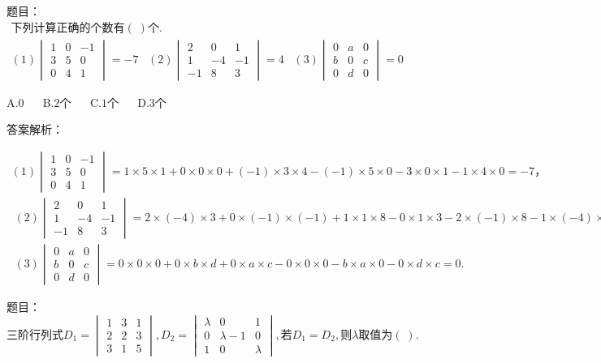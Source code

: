 题目：$\begin{array}{l}\mathrm{下列计算正确的个数有}(\;)个.\\(1)\begin{vmatrix}1&0&-1\\3&5&0\\0&4&1\end{vmatrix}=-7\;\;\;(2)\begin{vmatrix}2&0&1\\1&-4&-1\\-1&8&3\end{vmatrix}=4\;\;\;(3)\begin{vmatrix}0&a&0\\b&0&c\\0&d&0\end{vmatrix}=0\end{array}$

A.$0$ $\quad$ B.$2个$ $\quad$ C.$1个$ $\quad$ D.$3个$

答案解析：

$\begin{array}{l}(1)\begin{vmatrix}1&0&-1\\3&5&0\\0&4&1\end{vmatrix}=1\times5\times1+0\times0\times0+(-1)\times3\times4-(-1)\times5\times0-3\times0\times1-1\times4\times0=-7，\\\;(2)\begin{vmatrix}2&0&1\\1&-4&-1\\-1&8&3\end{vmatrix}=2\times(-4)\times3+0\times(-1)\times(-1)+1\times1\times8-0\times1\times3-2\times(-1)\times8-1\times(-4)\times(-1)=-24+8+16-4=-4，\\\;(3)\begin{vmatrix}0&a&0\\b&0&c\\0&d&0\end{vmatrix}=0\times0\times0+0\times b\times d+0\times a\times c-0\times0\times0-b\times a\times0-0\times d\times c=0.\end{array}$



题目：$\mathrm{三阶行列式}D_1=\begin{vmatrix}1&3&1\\2&2&3\\3&1&5\end{vmatrix},D_2=\begin{vmatrix}\lambda&0&1\\0&\lambda-1&0\\1&0&\lambda\end{vmatrix},若D_1=D_2,则\lambda\mathrm{取值为}(\;).$

